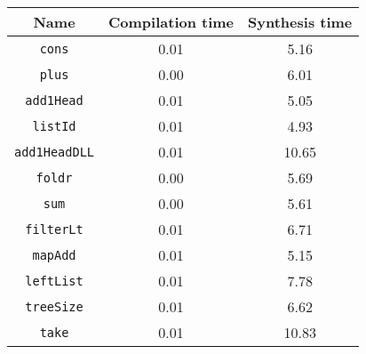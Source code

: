 \begin{tabular}{|c|c|c|}
\hline
Name & Compilation time & Synthesis time\\
\hline
\verb|cons| & 0.01 & 5.16\\
\verb|plus| & 0.00 & 6.01\\
\verb|add1Head| & 0.01 & 5.05\\
\verb|listId| & 0.01 & 4.93\\
\verb|add1HeadDLL| & 0.01 & 10.65\\
\verb|foldr| & 0.00 & 5.69\\
\verb|sum| & 0.00 & 5.61\\
\verb|filterLt| & 0.01 & 6.71\\
\verb|mapAdd| & 0.01 & 5.15\\
\verb|leftList| & 0.01 & 7.78\\
\verb|treeSize| & 0.01 & 6.62\\
\verb|take| & 0.01 & 10.83\\
\hline
\end{tabular}
